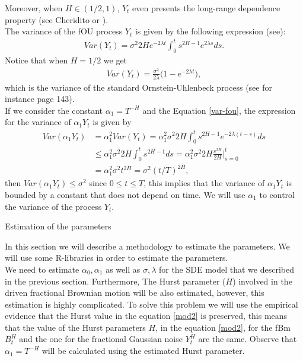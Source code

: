 \documentclass[12pt,reqno]{amsart}
\makeatletter
\def\section{\@startsection{section}{1}%
     \z@{.7\linespacing\@plus\linespacing}{.5\linespacing}%
     {\bfseries
     \centering
     }}
\theoremstyle{definition}
\theoremstyle{remark}
\numberwithin{equation}{section}
\makeatother
\begin{document}
Moreover, when $H \in(1/2,1)$, $Y_t$ even presents the long-range dependence property (see Cheridito
\cite{ch-ka-ma} or  \cite{ra}).\\

The variance of the fOU process $Y_t$ is given by the following expression (see\cite{ze-ch-ya}):
\begin{align}
 Var(Y_t)= \sigma^2 2H e^{-2\lambda t} \int_0^t s^{2H-1} e^{2\lambda s} ds.\label{var-fou}
\end{align}
Notice that when $H=1/2$ we get
\begin{align}
 Var(Y_t)= \frac{\sigma^2}{2\lambda}  \big(1-e^{-2\lambda t}\big),
\end{align}
which is the variance of the standard Ornstein-Uhlenbeck process (see for instance \cite{mik} page 143). \\

If we consider the constant $\alpha_1 = T^{-H}$ and the Equation \eqref{var-fou},
the expression for the variance of $\alpha_1 Y_t$ is given by
\begin{align}
  Var(\alpha_1 Y_t)&= \alpha_1^2 Var(Y_t)= \alpha_1^2\sigma^2 2H  \int_0^t s^{2H-1} e^{-2\lambda (t-s)} ds\nonumber
 \\
 &\le \alpha_1^2 \sigma^2 2H  \int_0^t s^{2H-1} ds= \alpha_1^2 \sigma^2 2H  \frac{s^{2H}}{2H}\Big|_{s=0}^t \nonumber
 \\
  &= \alpha_1^2 \sigma^2 t^{2H} = \sigma^2 (t/T)^{2H},\label{var-fou1}
\end{align}
then $Var(\alpha_1 Y_t)\le \sigma^2 $ since $0\le t\le T$, this implies that the variance of $\alpha_1 Y_t$
is bounded by a constant that does not depend on time. We will use $\alpha_1$  to control the variance of the process $Y_t$.



\section{Estimation of the parameters}
\label{esti}

In this section we will describe a methodology to estimate the parameters.
We will use some R-libraries in order to estimate the parameters. \\

We need to estimate $\alpha_0, \alpha_1$ as well as $\sigma,\lambda$ for the SDE model that we described in the previous section. Furthermore,
The Hurst parameter ($H$) involved in the driven fractional Brownian motion will be also estimated, however, this estimation is highly complicated.
To solve this problem we will use the empirical evidence that the Hurst value in the equation \eqref{mod2}
is preserved, this means that the  value of the  Hurst parameters $H$, in the equation \eqref{mod2}, for the fBm $B_t^H$ and the one for the
fractional Gaussian noise $Y_t^H$ are the same. Observe that $\alpha_1=T^{-H}$ will be calculated using the estimated Hurst parameter.
\end{document}

